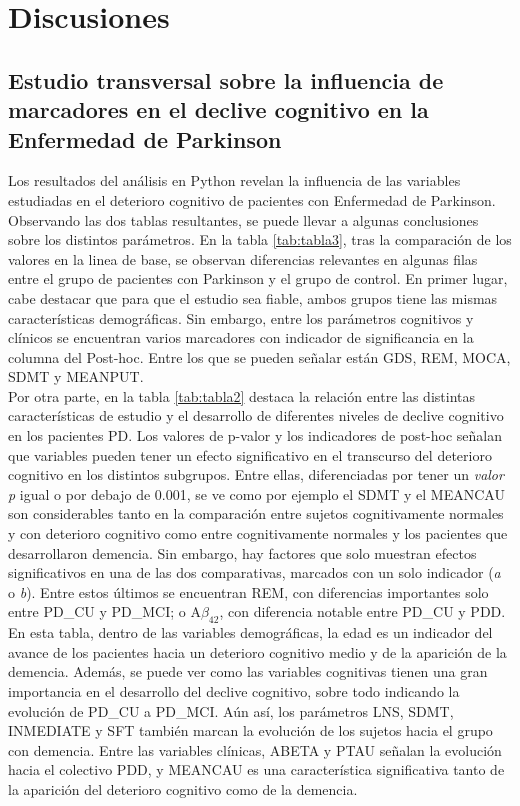 \chapter{Discusiones} \label{discusiones}

\section{Estudio transversal sobre la influencia de marcadores en el declive cognitivo en la Enfermedad de Parkinson}
Los resultados del análisis en Python revelan la influencia de las variables estudiadas en el deterioro cognitivo de pacientes con Enfermedad de Parkinson.\\

Observando las dos tablas resultantes, se puede llevar a algunas conclusiones sobre los distintos parámetros. En la tabla \ref{tab:tabla3}, tras la comparación de los valores en la linea de base, se observan diferencias relevantes en algunas filas entre el grupo de pacientes con Parkinson y el grupo de control. En primer lugar, cabe destacar que para que el estudio sea fiable, ambos grupos tiene las mismas características demográficas. Sin embargo, entre los parámetros cognitivos y clínicos se encuentran varios marcadores con indicador de significancia en la columna del Post-hoc. Entre los que se pueden señalar están GDS, REM, MOCA, SDMT y MEANPUT. \\

Por otra parte, en la tabla \ref{tab:tabla2} destaca la relación entre las distintas características de estudio y el desarrollo de diferentes niveles de declive cognitivo en los pacientes PD. Los valores de p-valor y los indicadores de post-hoc señalan que variables pueden tener un efecto significativo en el transcurso del deterioro cognitivo en los distintos subgrupos. Entre ellas, diferenciadas por tener un \textit{valor p} igual o por debajo de 0.001, se ve como por ejemplo el SDMT y el MEANCAU son considerables tanto en la comparación entre sujetos cognitivamente normales y con deterioro cognitivo como entre cognitivamente normales y los pacientes que desarrollaron demencia. Sin embargo, hay factores que solo muestran efectos significativos en una de las dos comparativas, marcados con un solo indicador (\textit{a} o \textit{b}). Entre estos últimos se encuentran REM, con diferencias importantes solo entre PD\_CU y PD\_MCI; o A$\beta_{42}$, con diferencia notable entre PD\_CU y PDD. En esta tabla, dentro de las variables demográficas, la edad es un indicador del avance de los pacientes hacia un deterioro cognitivo medio y de la aparición de la demencia. Además, se puede ver como las variables cognitivas tienen una gran importancia en el desarrollo del declive cognitivo, sobre todo indicando la evolución de PD\_CU a PD\_MCI. Aún así, los parámetros LNS, SDMT, INMEDIATE y SFT también marcan la evolución de los sujetos hacia el grupo con demencia. Entre las variables clínicas, ABETA y PTAU señalan la evolución hacia el colectivo PDD, y MEANCAU es una característica significativa tanto de la aparición del deterioro cognitivo como de la demencia. \\

